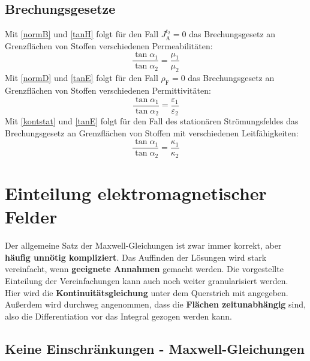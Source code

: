 		\subsection{Brechungsgesetze}
		\begin{center}
			
		\end{center}
		 Mit \ref{normB} und \ref{tanH} folgt für den Fall $J_\mathrm{A}^{t_2} = 0$ das Brechungsgesetz an Grenzflächen von Stoffen verschiedenen Permeabilitäten:			
		\begin{equation}
			\boxed{\dfrac{\tan \alpha_1}{\tan \alpha_2} = \dfrac{\mu_1}{\mu_2}}
		\end{equation}
		Mit \ref{normD} und \ref{tanE} folgt für den Fall $\rho_\mathrm{F}= 0$ das Brechungsgesetz an Grenzflächen von Stoffen verschiedenen Permittivitäten:	
		\begin{equation}
			\boxed{\dfrac{\tan \alpha_1}{\tan \alpha_2} = \dfrac{\varepsilon_1}{\varepsilon_2}}
		\end{equation}
		Mit \ref{kontstat} und \ref{tanE} folgt für den Fall des stationären Strömungsfeldes das Brechungsgesetz an Grenzflächen von Stoffen mit verschiedenen Leitfähigkeiten:
		\begin{equation}
			\boxed{\dfrac{\tan \alpha_1}{\tan \alpha_2} = \dfrac{\kappa_1}{\kappa_2}}
		\end{equation}
 \section{Einteilung elektromagnetischer Felder}
  Der allgemeine Satz der Maxwell-Gleichungen ist zwar immer korrekt, aber
  \textbf{häufig unnötig kompliziert}. Das Auffinden der Lösungen wird stark vereinfacht,
  wenn \textbf{geeignete Annahmen} gemacht werden. Die vorgestellte Einteilung
  der Vereinfachungen kann auch noch weiter granularisiert werden.\\
  Hier wird die \textbf{Kontinuitätsgleichung} unter dem Querstrich mit angegeben. Außerdem wird durchweg angenommen, dass die \textbf{Flächen zeitunabhängig} sind, also die Differentiation vor das Integral gezogen werden kann.
  \subsection{Keine Einschränkungen - Maxwell-Gleichungen}

